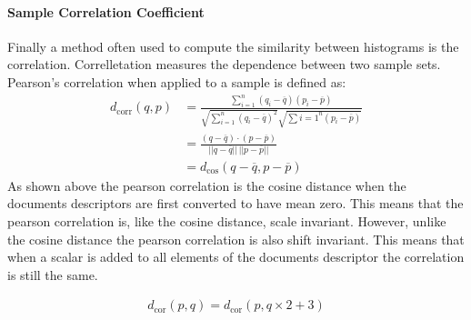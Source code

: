 \paragraph{Sample Correlation Coefficient} Finally a method often used to compute the
similarity between histograms is the correlation. Correlletation measures
the dependence between two sample sets. Pearson's correlation when applied to
a sample is defined as:
\begin{align}
  d_{\textrm{corr}}(q,p) &= \frac{\sum_{i=1}^n(q_i - \overline{q})(p_i - \overline{p})}{\sqrt{\sum_{i=1}^n(q_i - \overline{q})^2}\sqrt{\sum{i=1}^n(p_i - \overline{p})}} \\
    &= \frac{(q - \overline{q}) \cdot (p - \overline{p})}{||q - \overline{q}||\,||p - \overline{p}||} \\
    &= d_\textrm{cos}(q - \overline{q}, p - \overline{p})
\end{align}
As shown above the pearson correlation is the cosine distance when the 
documents descriptors are first converted to have mean zero. This means that
the pearson correlation is, like the cosine distance, scale invariant. However,
unlike the cosine distance the pearson correlation is also shift invariant. This
means that when a scalar is added to all elements of the documents descriptor
the correlation is still the same.

\begin{align*}
  d_\textrm{cor}(p,q) = d_\textrm{cor}(p, q\times2 + 3)
\end{align*}
